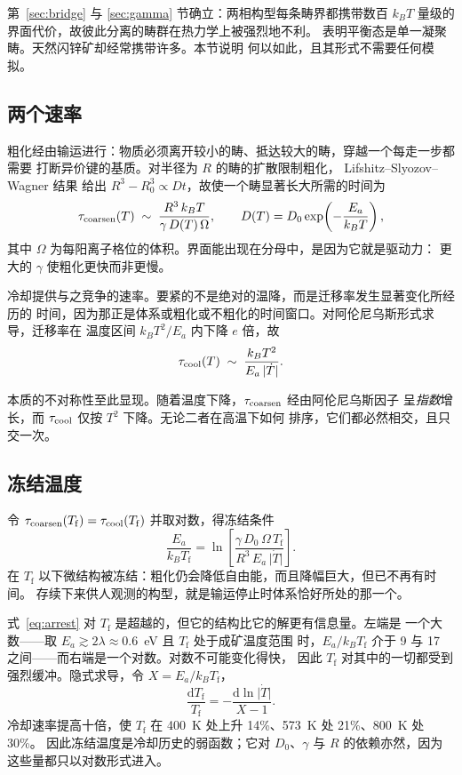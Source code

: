 \documentclass[11pt,a4paper]{ctexart}
\newcommand{\Tf}{T_{\mathrm{f}}}
\begin{document}
第~\ref{sec:bridge} 与 \ref{sec:gamma} 节确立：两相构型每条畴界都携带数百
$k_BT$ 量级的界面代价，故彼此分离的畴群在热力学上被强烈地不利。
\citet{yu2026b} 表明平衡态是单一凝聚畴。天然闪锌矿却经常携带许多。本节说明
何以如此，且其形式不需要任何模拟。

\subsection{两个速率}

粗化经由输运进行：物质必须离开较小的畴、抵达较大的畴，穿越一个每走一步都需要
打断异价键的基质。对半径为 $R$ 的畴的扩散限制粗化，
Lifshitz--Slyozov--Wagner 结果 \citep{lifshitz1961} 给出
$R^3 - R_0^3 \propto D t$，故使一个畴显著长大所需的时间为
\begin{equation}
\tau_{\rm coarsen}(T) \;\sim\; \frac{R^3\, k_B T}{\gamma\, D(T)\, \Omega},
\qquad
D(T) = D_0 \exp\!\left(-\frac{E_a}{k_B T}\right),
\label{eq:taucoarsen}
\end{equation}
其中 $\Omega$ 为每阳离子格位的体积。界面能出现在分母中，是因为它就是驱动力：
更大的 $\gamma$ 使粗化更快而非更慢。

冷却提供与之竞争的速率。要紧的不是绝对的温降，而是迁移率发生显著变化所经历的
时间，因为那正是体系或粗化或不粗化的时间窗口。对阿伦尼乌斯形式求导，迁移率在
温度区间 $k_BT^2/E_a$ 内下降 $e$ 倍，故
\begin{equation}
\tau_{\rm cool}(T) \;\sim\; \frac{k_B T^2}{E_a\, \lvert \dot{T} \rvert}.
\label{eq:taucool}
\end{equation}

本质的不对称性至此显现。随着温度下降，$\tau_{\rm coarsen}$ 经由阿伦尼乌斯因子
呈\emph{指数}增长，而 $\tau_{\rm cool}$ 仅按 $T^2$ 下降。无论二者在高温下如何
排序，它们都必然相交，且只交一次。

\subsection{冻结温度}

令 $\tau_{\rm coarsen}(\Tf) = \tau_{\rm cool}(\Tf)$ 并取对数，得冻结条件
\begin{equation}
\frac{E_a}{k_B \Tf}
 = \ln\!\left[ \frac{\gamma\, D_0\, \Omega\, \Tf}
                    {R^3\, E_a\, \lvert \dot{T} \rvert} \right].
\label{eq:arrest}
\end{equation}
在 $\Tf$ 以下微结构被冻结：粗化仍会降低自由能，而且降幅巨大，但已不再有时间。
存续下来供人观测的构型，就是输运停止时体系恰好所处的那一个。

式~\eqref{eq:arrest} 对 $\Tf$ 是超越的，但它的结构比它的解更有信息量。左端是
一个大数——取 $E_a \gtrsim 2\lambda \approx 0.6$~eV 且 $\Tf$ 处于成矿温度范围
时，$E_a/k_B\Tf$ 介于 9 与 17 之间——而右端是一个对数。对数不可能变化得快，
因此 $\Tf$ 对其中的一切都受到强烈缓冲。隐式求导，令 $X = E_a/k_B\Tf$，
\begin{equation}
\frac{\mathrm{d}\Tf}{\Tf} = -\frac{\mathrm{d}\ln \lvert\dot{T}\rvert}{X - 1}.
\label{eq:tfsens}
\end{equation}
冷却速率提高十倍，使 $\Tf$ 在 400~K 处上升 14\%、573~K 处 21\%、800~K 处 30\%。
因此冻结温度是冷却历史的弱函数；它对 $D_0$、$\gamma$ 与 $R$ 的依赖亦然，因为
这些量都只以对数形式进入。
\end{document}
